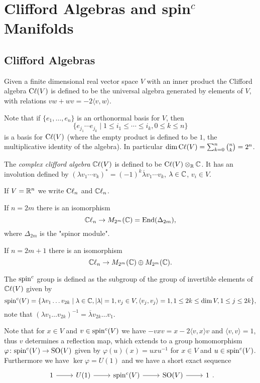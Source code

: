 
\section{Clifford Algebras and spin$^c$ Manifolds}
\subsection{Clifford Algebras}
\begin{definition}
 Given a finite dimensional real vector space $V$ with an inner product the Clifford algebra $\mathrm{C}\ell(V)$ is defined to be the universal algebra generated by elements of $V$, with relations $vw+wv=-2\langle v,w\rangle$.
\end{definition}

\noindent Note that if $\{e_1,\ldots,e_n\}$ is an orthonormal basis for $V$, then $$\{e_{j_1}\cdots e_{j_k}\mid 1\leq i_1\leq\cdots\leq i_k,0\leq k\leq n\}$$ is a basis for $\mathrm{C}\ell(V)$ (where the empty product is defined to be $1$, the multiplicative identity of the algebra). In particular $\dim\mathrm{C}\ell(V)=\sum_{k=0}^n \binom{n}{k} = 2^n$.

\begin{definition}
 The \emph{complex clifford algebra} $\mathbb{C}\ell(V)$ is defined to be $\mathrm{C}\ell(V)\otimes_{\mathbb{R}}\mathbb{C}$. It has an involution defined by $(\lambda v_1\cdots v_k)^\ast=(-1)^k\overline{\lambda} v_1\cdots v_k$, $\lambda\in\mathbb{C}$, $v_i\in V$.
\end{definition}

\noindent If $V=\mathbb{R}^n$ we write $\mathrm{C}\ell_n$ and $\mathbb{C}\ell_n$.
\begin{fact} If $n=2m$ there is an isomorphism
$$\mathbb{C}\ell_n\to M_{2^m}(\mathbb{C})=\mathrm{End}(\Delta_{2m}),$$ where $\Delta_{2m}$ is the "spinor module".

\noindent If $n=2m+1$ there is an isomorphism $$\mathbb{C}\ell_n\to M_{2^m}(\mathbb{C})\oplus M_{2^m}(\mathbb{C}).$$
 \end{fact}

\begin{definition} 
 The $\mathrm{spin}^c$ group is defined as the subgroup of the group of invertible elements of $\mathbb{C}\ell(V)$ given by 
 $$\mathrm{spin}^c(V)=\{\lambda v_1\ldots v_{2k}\mid \lambda\in\mathbb{C},|\lambda|=1, v_j\in V, \langle v_j,v_j\rangle=1,1\leq 2k\leq\dim V,1\leq j\leq 2k\},$$
 note that $(\lambda v_1\ldots v_{2k})^{-1}=\overline{\lambda}v_{2k}\ldots v_1$.
\end{definition}

\noindent Note that for $x\in V$ and $v\in\mathrm{spin}^c(V)$ we have $-vxv=x-2\langle v,x\rangle v$ and $\langle v,v\rangle=1$, thus $v$ determines a reflection map, which extends to a group homomorphism $\varphi\colon\mathrm{spin}^c(V)\to\mathrm{SO}(V)$ given by $\varphi(u)(x)=uxu^{-1}$ for $x\in V$ and $u\in\mathrm{spin}^c(V)$. Furthermore we have $\ker\varphi=U(1)$ and we have a short exact sequence
$$\begin{tikzcd}1\arrow[r] & U(1)\arrow[r] & \spinc(V)\arrow[r] & \SO(V) \arrow[r] & 1\end{tikzcd}.$$

